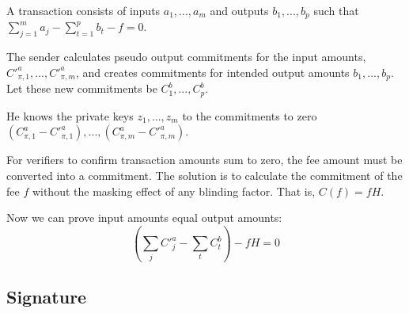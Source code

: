 A transaction consists of inputs \(a_1, ..., a_m\) and outputs \(b_1, ..., b_p\) such that \(\sum\limits_{j=1}^m a_j - \sum\limits_{t=1}^{p} b_t - f = 0\).

The sender calculates pseudo output commitments for the input amounts, $C'^a_{\pi,1}, ..., C'^a_{\pi,m}$, and creates commitments for intended output amounts $b_1, ..., b_p$. Let these new commitments be $C^b_1, ..., C^b_p$.

He knows the private keys $z_1,...,z_m$ to the commitments to zero $(C^a_{\pi,1} - C'^a_{\pi,1}),...,(C^a_{\pi,m} - C'^a_{\pi,m})$.

For verifiers to confirm transaction amounts sum to zero, the fee amount must be converted into a commitment. The solution is to calculate the commitment of the fee $f$ without the masking effect of any blinding factor. That is, $C(f) = f H$.

Now we can prove input amounts equal output amounts:\\
\[(\sum_j C'^a_{j} - \sum_t C^b_{t}) - f H = 0\]


\subsection{Signature}
\label{subsec:ringct-full-signature}

